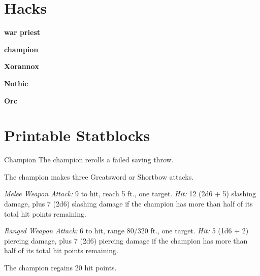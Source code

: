 \documentclass[10pt,a4paper,twoside,bg=print,twocolumn,openany,nodeprecatedcode]{dndbook}
\date{}
\begin{document}
\frontmatter
\tableofcontents
\mainmatter
\chapter{Hacks}
\textbf{war priest}

\textbf{champion}

\textbf{Xorannox}

\textbf{Nothic}

\textbf{Orc}

\chapter*{Printable Statblocks}
\pagestyle{empty}

\begin{DndMonster}[float=t]{Champion}
\DndMonsterBasics[
armor-class = {18 (plate armor)},
hit-points = {\DndDice{22d8 + 44}},
speed = {30 ft.}
]
\DndMonsterAbilityScores[
 str = 20,
 dex = 15,
 con = 14,
 int = 10,
 wis = 14,
 cha = 12
]
\DndMonsterDetails[
saving-throws = {Str +9, Con +6},
skills = {Athletics +9, Intimidation +5, Perception +6},
languages = {any one language (usually Common)},
challenge = 9,
]
The champion rerolls a failed saving throw.

The champion makes three Greatsword or Shortbow attacks.

\textsl{Melee Weapon Attack:} 9 to hit, reach 5 ft., one target. \textsl{Hit:} 12 (2d6 + 5) slashing damage, plus 7 (2d6) slashing damage if the champion has more than half of its total hit points remaining.

\textsl{Ranged Weapon Attack:} 6 to hit, range 80/320 ft., one target. \textsl{Hit:} 5 (1d6 + 2) piercing damage, plus 7 (2d6) piercing damage if the champion has more than half of its total hit points remaining.

The champion regains 20 hit points.

\end{DndMonster}
\end{document}
